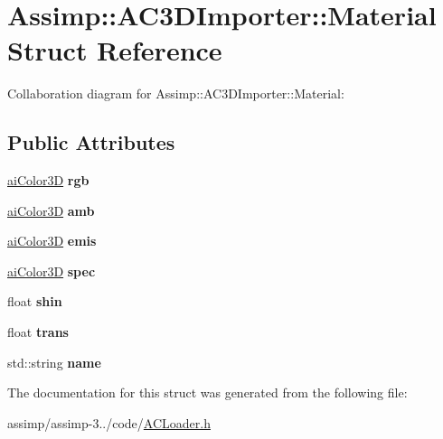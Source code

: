 \hypertarget{struct_assimp_1_1_a_c3_d_importer_1_1_material}{\section{Assimp\+:\+:A\+C3\+D\+Importer\+:\+:Material Struct Reference}
\label{struct_assimp_1_1_a_c3_d_importer_1_1_material}
}


Collaboration diagram for Assimp\+:\+:A\+C3\+D\+Importer\+:\+:Material\+:
\subsection*{Public Attributes}
\begin{DoxyCompactItemize}
\item 
\hypertarget{struct_assimp_1_1_a_c3_d_importer_1_1_material_ae54fa10080546727caf717b0125fde30}{\hyperlink{structai_color3_d}{ai\+Color3\+D} {\bfseries rgb}}\label{struct_assimp_1_1_a_c3_d_importer_1_1_material_ae54fa10080546727caf717b0125fde30}

\item 
\hypertarget{struct_assimp_1_1_a_c3_d_importer_1_1_material_aa5f284fe0692d596c90e45ab462c4586}{\hyperlink{structai_color3_d}{ai\+Color3\+D} {\bfseries amb}}\label{struct_assimp_1_1_a_c3_d_importer_1_1_material_aa5f284fe0692d596c90e45ab462c4586}

\item 
\hypertarget{struct_assimp_1_1_a_c3_d_importer_1_1_material_ae30defed8b3ea6b2530a853281e144b9}{\hyperlink{structai_color3_d}{ai\+Color3\+D} {\bfseries emis}}\label{struct_assimp_1_1_a_c3_d_importer_1_1_material_ae30defed8b3ea6b2530a853281e144b9}

\item 
\hypertarget{struct_assimp_1_1_a_c3_d_importer_1_1_material_a82f28aaeb6962903ee91232a89231eca}{\hyperlink{structai_color3_d}{ai\+Color3\+D} {\bfseries spec}}\label{struct_assimp_1_1_a_c3_d_importer_1_1_material_a82f28aaeb6962903ee91232a89231eca}

\item 
\hypertarget{struct_assimp_1_1_a_c3_d_importer_1_1_material_a95811e78f910dde07873ac7ed672a421}{float {\bfseries shin}}\label{struct_assimp_1_1_a_c3_d_importer_1_1_material_a95811e78f910dde07873ac7ed672a421}

\item 
\hypertarget{struct_assimp_1_1_a_c3_d_importer_1_1_material_a880ab3f47ae1d83f834d64fc017dbb3e}{float {\bfseries trans}}\label{struct_assimp_1_1_a_c3_d_importer_1_1_material_a880ab3f47ae1d83f834d64fc017dbb3e}

\item 
\hypertarget{struct_assimp_1_1_a_c3_d_importer_1_1_material_a8579d8e0ab5f21fcf46f5d5be3b365a3}{std\+::string {\bfseries name}}\label{struct_assimp_1_1_a_c3_d_importer_1_1_material_a8579d8e0ab5f21fcf46f5d5be3b365a3}

\end{DoxyCompactItemize}


The documentation for this struct was generated from the following file\+:\begin{DoxyCompactItemize}
\item 
assimp/assimp-\/3../code/\hyperlink{_a_c_loader_8h}{A\+C\+Loader.\+h}\end{DoxyCompactItemize}
